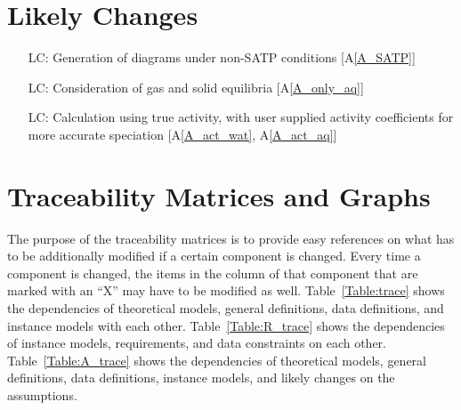 \documentclass[12pt]{article}
\newcommand{\aref}[1]{A\ref{#1}}
\newcounter{lcnum} %
\begin{document}
\section{Likely Changes}    

\noindent \begin{itemize}

\item[LC\refstepcounter{lcnum}\thelcnum\label{LC_SATP}:] Generation of diagrams 
  under non-SATP conditions [\aref{A_SATP}]
\item[LC\refstepcounter{lcnum}\thelcnum\label{LC_state}:] Consideration of gas 
  and solid equilibria [\aref{A_only_aq}]
\item[LC\refstepcounter{lcnum}\thelcnum\label{LC_act}:] Calculation using true 
  activity, with user supplied activity coefficients for more accurate 
  speciation [\aref{A_act_wat}, \aref{A_act_aq}] 

\end{itemize}


\section{Traceability Matrices and Graphs}

The purpose of the traceability matrices is to provide easy references on what
has to be additionally modified if a certain component is changed.  Every time a
component is changed, the items in the column of that component that are marked
with an ``X'' may have to be modified as well.  Table~\ref{Table:trace} shows 
the dependencies of theoretical models, general definitions, data definitions, 
and instance models with each other. Table~\ref{Table:R_trace} shows the
dependencies of instance models, requirements, and data constraints on each
other. Table~\ref{Table:A_trace} shows the dependencies of theoretical models,
general definitions, data definitions, instance models, and likely changes on
the assumptions.
\end{document}
